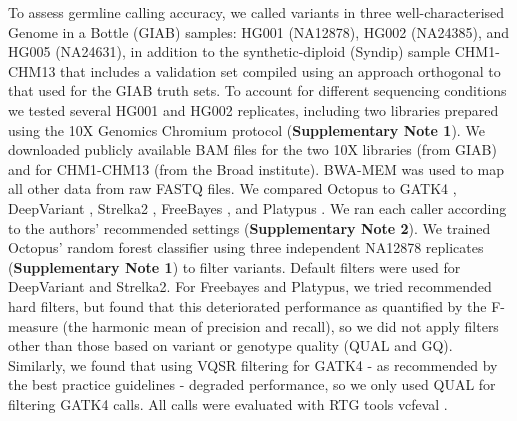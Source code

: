 \documentclass[notitlepage, twocolumn, 10pt]{article}
\begin{document}
To assess germline calling accuracy, we called variants in three well-characterised Genome in a Bottle (GIAB) \cite{RN153} samples: HG001 (NA12878), HG002 (NA24385), and HG005 (NA24631), in addition to the synthetic-diploid (Syndip) sample CHM1-CHM13 \cite{RN605} that includes a validation set compiled using an approach orthogonal to that used for the GIAB truth sets. To account for different sequencing conditions we tested several HG001 and HG002 replicates, including two libraries prepared using the 10X Genomics Chromium protocol (\textbf{Supplementary Note 1}). We downloaded publicly available BAM files for the two 10X libraries (from GIAB) and for CHM1-CHM13 (from the Broad institute). BWA-MEM \cite{RN539} was used to map all other data from raw FASTQ files. We compared Octopus to GATK4 \cite{RN598}, DeepVariant \cite{RN619}, Strelka2 \cite{RN604}, FreeBayes \cite{RN538}, and Platypus \cite{RN5}. We ran each caller according to the authors' recommended settings (\textbf{Supplementary Note 2}). We trained Octopus' random forest classifier using three independent NA12878 replicates (\textbf{Supplementary Note 1}) to filter variants. Default filters were used for DeepVariant and Strelka2. For Freebayes and Platypus, we tried recommended hard filters, but found that this deteriorated performance as quantified by the F-measure (the harmonic mean of precision and recall), so we did not apply filters other than those based on variant or genotype quality (QUAL and GQ). Similarly, we found that using VQSR filtering for GATK4 - as recommended by the best practice guidelines - degraded performance, so we only used QUAL for filtering GATK4 calls. All calls were evaluated with RTG tools vcfeval \cite{RN169}.
\end{document}
